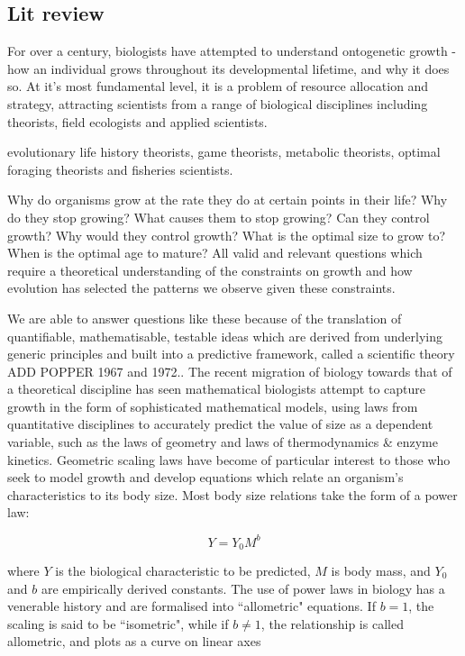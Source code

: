 \documentclass[a4paper]{article} %
\begin{document}
    \subsection{Lit review}
        For over a century, biologists have attempted to understand ontogenetic growth - how an individual grows throughout its developmental lifetime, and why it does so. At it's most fundamental level, it is a problem of resource allocation and strategy, attracting scientists from a range of biological disciplines including theorists, field ecologists and applied scientists.
        
        evolutionary life history theorists, game theorists, metabolic theorists, optimal foraging theorists and fisheries scientists. 
        
        Why do organisms grow at the rate they do at certain points in their life? Why do they stop growing? What causes them to stop growing? Can they control growth? Why would they control growth? What is the optimal size to grow to? When is the optimal age to mature? All valid and relevant questions which require a theoretical understanding of the constraints on growth and how evolution has selected the patterns we observe given these constraints.

        We are able to answer questions like these because of the translation of quantifiable, mathematisable, testable ideas which are derived from underlying generic principles and built into a predictive framework, called a scientific theory \autocite{peters1983, West2011}ADD POPPER 1967 and 1972.. The recent migration of biology towards that of a theoretical discipline has seen mathematical biologists attempt to capture growth in the form of sophisticated mathematical models, using laws from quantitative disciplines to accurately predict the value of size as a dependent variable, such as the laws of geometry and laws of thermodynamics \& enzyme kinetics. Geometric scaling laws have become of particular interest to those who seek to model growth and develop equations which relate an organism's characteristics to its body size. Most body size relations take the form of a power law:

        \begin{equation}
            Y = Y_0 M^b
        \end{equation}

        where $Y$ is the biological characteristic to be predicted, $M$ is body mass, and $Y_0$ and $b$ are empirically derived constants. The use of power laws in biology has a venerable history and are formalised into ``allometric" equations. If $b = 1$, the scaling is said to be ``isometric", while if $b \neq 1$, the relationship is called allometric, and plots as a curve on linear axes \autocite{brown2000-scaling-book}
\end{document}
